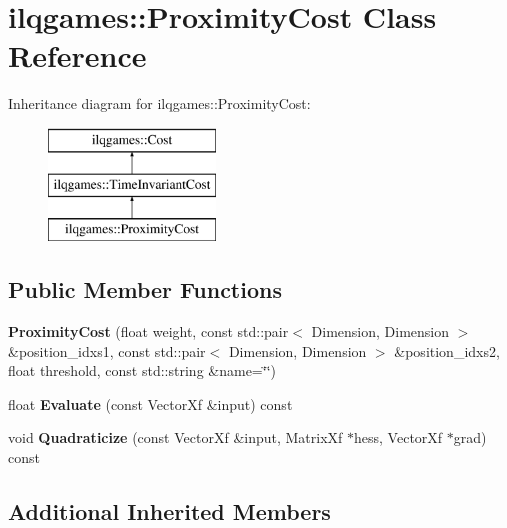 \hypertarget{classilqgames_1_1_proximity_cost}{}\section{ilqgames\+:\+:Proximity\+Cost Class Reference}
\label{classilqgames_1_1_proximity_cost}
Inheritance diagram for ilqgames\+:\+:Proximity\+Cost\+:\begin{figure}[H]
\begin{center}
\leavevmode
\includegraphics[height=3.000000cm]{classilqgames_1_1_proximity_cost}
\end{center}
\end{figure}
\subsection*{Public Member Functions}
\begin{DoxyCompactItemize}
\item 
{\bfseries Proximity\+Cost} (float weight, const std\+::pair$<$ Dimension, Dimension $>$ \&position\+\_\+idxs1, const std\+::pair$<$ Dimension, Dimension $>$ \&position\+\_\+idxs2, float threshold, const std\+::string \&name=\char`\"{}\char`\"{})\hypertarget{classilqgames_1_1_proximity_cost_a7b9f02baf7979aef9436f3f055fc8b81}{}\label{classilqgames_1_1_proximity_cost_a7b9f02baf7979aef9436f3f055fc8b81}

\item 
float {\bfseries Evaluate} (const Vector\+Xf \&input) const \hypertarget{classilqgames_1_1_proximity_cost_a0c5f46e7dba52dc6b1cb07c718b628ca}{}\label{classilqgames_1_1_proximity_cost_a0c5f46e7dba52dc6b1cb07c718b628ca}

\item 
void {\bfseries Quadraticize} (const Vector\+Xf \&input, Matrix\+Xf $\ast$hess, Vector\+Xf $\ast$grad) const \hypertarget{classilqgames_1_1_proximity_cost_a832577449198c37e1b7fe13fc9792fbf}{}\label{classilqgames_1_1_proximity_cost_a832577449198c37e1b7fe13fc9792fbf}

\end{DoxyCompactItemize}
\subsection*{Additional Inherited Members}



